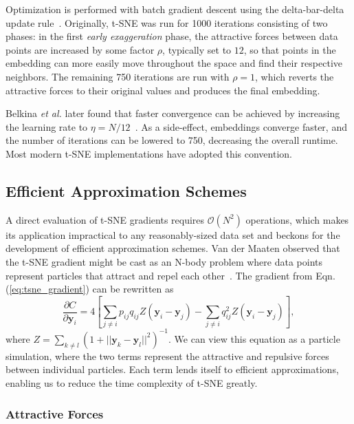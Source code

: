 \documentclass[letter]{article}
\begin{document}
Optimization is performed with batch gradient descent using the delta-bar-delta update rule~\cite{jacobs1988increased}. Originally, t-SNE was run for 1000 iterations consisting of two phases: in the first \textit{early exaggeration} phase, the attractive forces between data points are increased by some factor $\rho$, typically set to $12$, so that points in the embedding can more easily move throughout the space and find their respective neighbors. The remaining 750 iterations are run with $\rho=1$, which reverts the attractive forces to their
original values and produces the final embedding.

Belkina \textit{et al.} later found that faster convergence can be achieved by increasing the learning rate to $\eta=N/12$~\cite{belkina2019automated}. As a side-effect, embeddings converge faster, and the number of iterations can be
lowered to 750, decreasing the overall runtime.  Most modern t-SNE implementations have adopted this convention.

\subsection*{Efficient Approximation Schemes} A direct evaluation of t-SNE gradients requires $\mathcal{O}(N^2)$ operations, which makes its application impractical to any reasonably-sized data set and beckons for the development of efficient approximation schemes. Van der Maaten observed that the t-SNE gradient might be cast as an N-body problem where data points represent particles that attract and repel each other~\cite{van2014accelerating}. The gradient from Eqn. (\ref{eq:tsne_gradient}) can be rewritten as
\begin{equation}
\frac{\partial C}{\partial \mathbf{y}_i} = 4 \left [ \sum_{j \neq i} p_{ij} q_{ij} Z \left ( \mathbf{y}_i - \mathbf{y}_j \right ) -\sum_{j \neq i} q_{ij}^2 Z \left ( \mathbf{y}_i - \mathbf{y}_j \right ) \right ], \label{eq:grad_attr_rep}
\end{equation}
where $Z = \sum_{k \neq l}\left ( 1 + || \mathbf{y}_k - \mathbf{y}_l ||^2 \right
)^{-1}$. We can view this equation as a particle simulation, where the
two terms represent the attractive and repulsive forces between individual
particles. Each term lends itself to efficient approximations, enabling us
to reduce the time complexity of t-SNE greatly.

\subsubsection*{Attractive Forces}
\end{document}
